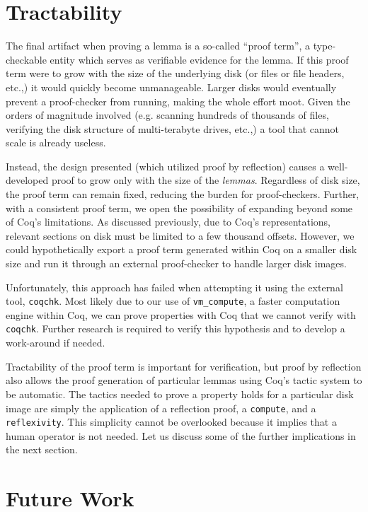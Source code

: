 \documentclass[nocopyrightspace,preprint]{sigplanconf}
\begin{document}
\section{Tractability}

The final artifact when proving a lemma is a so-called ``proof term'', a
type-checkable entity which serves as verifiable evidence for the lemma. If
this proof term were to grow with the size of the underlying disk (or files or
file headers, etc.,) it would quickly become unmanageable. Larger disks would
eventually prevent a proof-checker from running, making the whole effort moot.
Given the orders of magnitude involved (e.g. scanning hundreds of thousands of
files, verifying the disk structure of multi-terabyte drives, etc.,) a tool
that cannot scale is already useless.

Instead, the design presented (which utilized proof by reflection) causes a
well-developed proof to grow only with the size of the {\em lemmas}.
Regardless of disk size, the proof term can remain fixed, reducing the
burden for proof-checkers. Further, with a consistent proof term, we open the
possibility of expanding beyond some of Coq's limitations. As discussed
previously, due to Coq's representations, relevant sections on disk must be
limited to a few thousand offsets. However, we could hypothetically export a
proof term generated within Coq on a smaller disk size and run it through an
external proof-checker to handle larger disk images.

Unfortunately, this approach has failed when attempting it using the external
tool, {\tt coqchk}. Most likely due to our use of {\tt vm\_compute}, a faster
computation engine within Coq, we can prove properties with Coq that we cannot
verify with {\tt coqchk}. Further research is required to verify this
hypothesis and to develop a work-around if needed.

Tractability of the proof term is important for verification, but proof by
reflection also allows the proof generation of particular lemmas using Coq's
tactic system to be automatic. The tactics needed to prove a property holds
for a particular disk image are simply the application of a reflection proof,
a {\tt compute}, and a {\tt reflexivity}. This simplicity cannot be overlooked
because it implies that a human operator is not needed. Let us discuss some of
the further implications in the next section.

\section{Future Work}
\label{sec:future}
\end{document}
